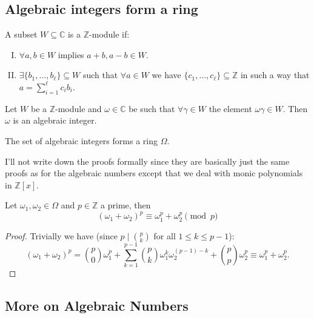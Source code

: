 \subsection{Algebraic integers form a ring}


\begin{definition}
   A subset \(W \subseteq \mathbb{C}\) is a \(\mathbb{Z}\)-module if:
   \begin{enumerate}[I.]
      \item \(\forall a, b \in W\) implies \(a + b, a - b \in W\).
      \item \(\exists \{b_1, \dots, b_\ell\} \subseteq W\) such that \(\forall a
         \in W\) we have \(\{c_1, \dots, c_{\ell}\} \subseteq \mathbb{Z} \) in
         such a way that \(a = \sum_{i = 1}^\ell c_i b_i\).
   \end{enumerate}
\end{definition}

\begin{proposition}
   Let \(W\) be a \(\mathbb{Z}\)-module and \(\omega \in \mathbb{C}\) be such
   that \(\forall \gamma \in W\) the element \(\omega\gamma \in W\). Then
   \(\omega\) is an algebraic integer.
\end{proposition}

\begin{proposition}
   The set of algebraic integers forms a ring \(\Omega\).
\end{proposition}

I'll not write down the proofs formally since they are basically just the same
proofs as for the algebraic numbers except that we deal with monic polynomials
in \(\mathbb{Z}[x]\).

\begin{proposition}
   Let \(\omega_1, \omega_2 \in \Omega\) and \(p \in \mathbb{Z}\) a prime, then 
   \[
      (\omega_1 + \omega_2)^p \equiv \omega_1^p + \omega_2^p \pmod{p}
   \] 
\end{proposition}

\begin{proof}
   Trivially we have (since \(p \mid \binom{p}{k}\) for all \(1 \leqslant k
   \leqslant p-1\)):
   \[
      (\omega_1 + \omega_2)^p = \binom{p}{0} \omega_1^p + \sum_{k=1}^{p-1}
      \binom{p}{k} \omega_1^{k}\omega_2^{(p-1)-k} + \binom{p}{p} \omega_2^p
      \equiv \omega_1^p + \omega_2^p.
   \]
\end{proof}

\subsection{More on Algebraic Numbers}

